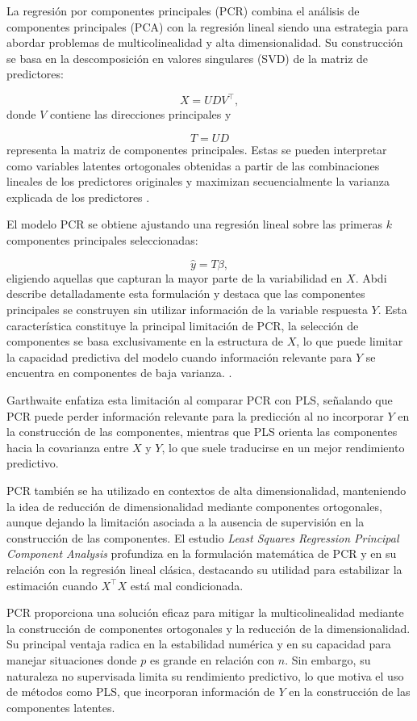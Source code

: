 \documentclass[12pt,a4paper]{report}
\begin{document}
La regresión por componentes principales (PCR) combina el análisis de componentes principales (PCA) con la regresión lineal siendo una estrategia para abordar problemas de multicolinealidad y alta dimensionalidad. Su construcción se basa en la descomposición en valores singulares (SVD) de la matriz de predictores:

\[
X = U D V^{\top},
\]
donde \(V\) contiene las direcciones principales y

\[
T = U D
\]
representa la matriz de componentes principales. Estas se pueden interpretar como variables latentes ortogonales obtenidas a partir de las combinaciones lineales de los predictores originales y maximizan secuencialmente la varianza explicada de los predictores \cite{abdi2010, liu2022}. 

El modelo PCR se obtiene ajustando una regresión lineal sobre las primeras \(k\) componentes principales seleccionadas:

\[
\hat{y} = T \beta,
\]
eligiendo aquellas que capturan la mayor parte de la variabilidad en \(X\). Abdi \cite{abdi2010} describe detalladamente esta formulación y destaca que las componentes principales se construyen sin utilizar información de la variable respuesta \(Y\). Esta característica constituye la principal limitación de PCR, la selección de componentes se basa exclusivamente en la estructura de \(X\), lo que puede limitar la capacidad predictiva del modelo cuando información relevante para \(Y\) se encuentra en componentes de baja varianza. \cite{liu2022}.

Garthwaite \cite{garthwaite1994} enfatiza esta limitación al comparar PCR con PLS, señalando que PCR puede perder información relevante para la predicción al no incorporar \(Y\) en la construcción de las componentes, mientras que PLS orienta las componentes hacia la covarianza entre \(X\) y \(Y\), lo que suele traducirse en un mejor rendimiento predictivo.

PCR también se ha utilizado en contextos de alta dimensionalidad, manteniendo la idea de reducción de dimensionalidad mediante componentes ortogonales, aunque dejando la limitación asociada a la ausencia de supervisión en la construcción de las componentes. El estudio \textit{Least Squares Regression Principal Component Analysis} \cite{pascual2020} profundiza en la formulación matemática de PCR y en su relación con la regresión lineal clásica, destacando su utilidad para estabilizar la estimación cuando \(X^\top X\) está mal condicionada.

PCR proporciona una solución eficaz para mitigar la multicolinealidad mediante la construcción de componentes ortogonales y la reducción de la dimensionalidad. Su principal ventaja radica en la estabilidad numérica y en su capacidad para manejar situaciones donde \(p\) es grande en relación con \(n\). Sin embargo, su naturaleza no supervisada limita su rendimiento predictivo, lo que motiva el uso de métodos como PLS, que incorporan información de \(Y\) en la construcción de las componentes latentes.
\end{document}
